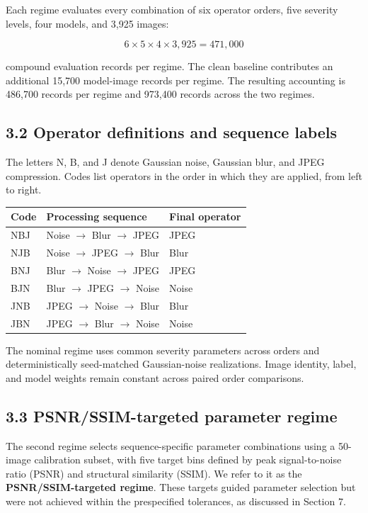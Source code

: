 \documentclass[10pt,twocolumn]{article}
\begin{document}
Each regime evaluates every combination of six operator orders, five
severity levels, four models, and 3,925 images:

\[
6\times5\times4\times3{,}925=471{,}000
\]

compound evaluation records per regime. The clean baseline contributes
an additional 15,700 model-image records per regime. The resulting
accounting is 486,700 records per regime and 973,400 records across the
two regimes.

\subsection{3.2 Operator definitions and sequence
labels}\label{operator-definitions-and-sequence-labels}

The letters N, B, and J denote Gaussian noise, Gaussian blur, and JPEG
compression. Codes list operators in the order in which they are
applied, from left to right.

\begin{center}
\footnotesize
\begin{tabularx}{\columnwidth}{@{}lXl@{}}
\toprule
Code & Processing sequence & Final operator \\
\midrule
NBJ & Noise $\rightarrow$ Blur $\rightarrow$ JPEG & JPEG \\
NJB & Noise $\rightarrow$ JPEG $\rightarrow$ Blur & Blur \\
BNJ & Blur $\rightarrow$ Noise $\rightarrow$ JPEG & JPEG \\
BJN & Blur $\rightarrow$ JPEG $\rightarrow$ Noise & Noise \\
JNB & JPEG $\rightarrow$ Noise $\rightarrow$ Blur & Blur \\
JBN & JPEG $\rightarrow$ Blur $\rightarrow$ Noise & Noise \\
\bottomrule
\end{tabularx}
\end{center}

The nominal regime uses common severity parameters across orders and
deterministically seed-matched Gaussian-noise realizations. Image
identity, label, and model weights remain constant across paired order
comparisons.

\subsection{3.3 PSNR/SSIM-targeted parameter
regime}\label{psnrssim-targeted-parameter-regime}

The second regime selects sequence-specific parameter combinations using
a 50-image calibration subset, with five target bins defined by peak
signal-to-noise ratio (PSNR) and structural similarity (SSIM). We refer
to it as the \textbf{PSNR/SSIM-targeted regime}. These targets guided
parameter selection but were not achieved within the prespecified
tolerances, as discussed in Section 7.
\end{document}
